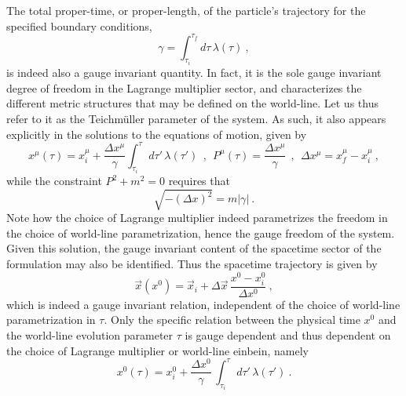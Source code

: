 \documentclass[a4paper,11pt]{article}
\begin{document}
The total proper-time, or proper-length, of the particle's trajectory
for the specified boundary conditions,
\begin{equation}
\gamma=\int_{\tau_i}^{\tau_f}d\tau\,\lambda(\tau)\ ,
\end{equation}
is indeed also a gauge invariant quantity. In fact, it is the sole
gauge invariant degree of freedom in the Lagrange multiplier sector,
and characterizes the different metric structures that may be defined
on the world-line. Let us thus refer to it as the Teichm\"uller parameter
of the system.\cite{JG1} As such, it also appears explicitly in the solutions
to the equations of motion, given by
\begin{equation}
x^\mu(\tau)=x^\mu_i+\frac{\Delta x^\mu}{\gamma}\int_{\tau_i}^\tau\,d\tau'\,
\lambda(\tau')\ \ ,\ \ 
P^\mu(\tau)=\frac{\Delta x^\mu}{\gamma}\ \ ,\ \ 
\Delta x^\mu=x^\mu_f-x^\mu_i\ ,
\end{equation}
while the constraint $P^2+m^2=0$ requires that
\begin{equation}
\sqrt{-\left(\Delta x\right)^2}=m|\gamma|\ .
\end{equation}
Note how the choice of Lagrange multiplier indeed parametrizes the
freedom in the choice of world-line parametrization, hence the gauge
freedom of the system. Given this solution, the gauge invariant content
of the spacetime sector of the formulation may also be identified.
Thus the spacetime trajectory is given by
\begin{equation}
\vec{x}(x^0)=\vec{x}_i+\Delta\vec{x}\,\frac{x^0-x^0_i}{\Delta x^0}\ ,
\end{equation}
which is indeed a gauge invariant relation, independent of the choice
of world-line parametrization in $\tau$. Only the specific relation
between the physical time $x^0$ and the world-line evolution parameter
$\tau$ is gauge dependent and thus dependent on the choice of
Lagrange multiplier or world-line einbein, namely
\begin{equation}
x^0(\tau)=x^0_i+\frac{\Delta x^0}{\gamma}\,\int_{\tau_i}^\tau\,
d\tau'\,\lambda(\tau')\ .
\end{equation}
\end{document}
